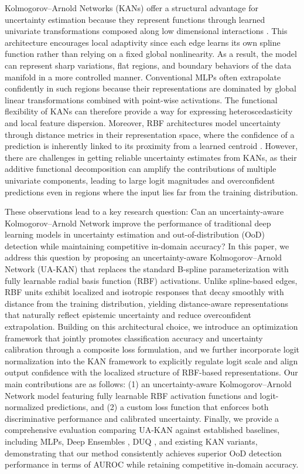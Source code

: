 \documentclass[conference]{IEEEtran}
\begin{document}
Kolmogorov–Arnold Networks (KANs) offer a structural advantage for uncertainty estimation because they represent functions through learned univariate transformations composed along low dimensional interactions \cite{liu2025kankolmogorovarnoldnetworks}. This architecture encourages local adaptivity since each edge learns its own spline function rather than relying on a fixed global nonlinearity. As a result, the model can represent sharp variations, flat regions, and boundary behaviors of the data manifold in a more controlled manner. Conventional MLPs often extrapolate confidently in such regions because their representations are dominated by global linear transformations combined with point-wise activations. The functional flexibility of KANs can therefore provide a way for expressing heteroscedasticity and local feature dispersion. Moreover, RBF architectures model uncertainty through distance metrics in their representation space, where the confidence of a prediction is inherently linked to its proximity from a learned centroid \cite{SPANOS2025130954}. However, there are challenges in getting reliable uncertainty estimates from KANs, as their additive functional decomposition can amplify the contributions of multiple univariate components, leading to large logit magnitudes and overconfident predictions even in regions where the input lies far from the training distribution.


These observations lead to a key research question: Can an uncertainty-aware Kolmogorov–Arnold Network improve the performance of traditional deep learning models in uncertainty estimation and out-of-distribution (OoD) detection while maintaining competitive in-domain accuracy? In this paper, we address this question by proposing an uncertainty-aware Kolmogorov–Arnold Network (UA-KAN) that replaces the standard B-spline parameterization with fully learnable radial basis function (RBF) activations. Unlike spline-based edges, RBF units exhibit localized and isotropic responses that decay smoothly with distance from the training distribution, yielding distance-aware representations that naturally reflect epistemic uncertainty and reduce overconfident extrapolation. Building on this architectural choice, we introduce an optimization framework that jointly promotes classification accuracy and uncertainty calibration through a composite loss formulation, and we further incorporate logit normalization into the KAN framework to explicitly regulate logit scale and align output confidence with the localized structure of RBF-based representations. Our main contributions are as follows: (1) an uncertainty-aware Kolmogorov–Arnold Network model featuring fully learnable RBF activation functions and logit-normalized predictions, and (2) a custom loss function that enforces both discriminative performance and calibrated uncertainty. Finally, we provide a comprehensive evaluation comparing UA-KAN against established baselines, including MLPs, Deep Ensembles \cite{lakshminarayanan2017simplescalablepredictiveuncertainty}, DUQ \cite{vanamersfoort2020uncertaintyestimationusingsingle}, and existing KAN variants, demonstrating that our method consistently achieves superior OoD detection performance in terms of AUROC while retaining competitive in-domain accuracy.
\end{document}
